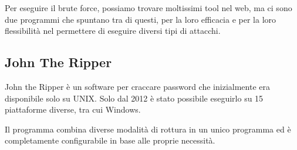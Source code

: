 Per eseguire il brute force, possiamo trovare moltissimi tool nel web, ma ci sono due programmi che spuntano tra di questi, per la loro efficacia e per la loro flessibilità nel permettere di eseguire diversi tipi di attacchi.

\subsection{John The Ripper}

John the Ripper è un software per craccare password che inizialmente era disponibile solo su UNIX. Solo dal 2012 è stato possibile eseguirlo su 15 piattaforme diverse, tra cui Windows.

Il programma combina diverse modalità di rottura in un unico programma ed è completamente configurabile in base alle proprie necessità.

